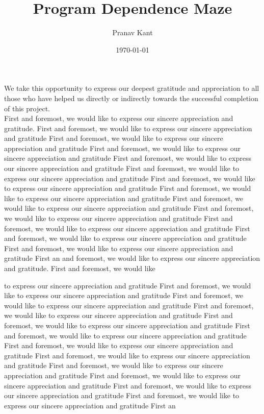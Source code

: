 \documentclass{nithreport}
\title{Program Dependence Maze}
\author{Pranav Kant}
\date{\today}
\begin{document}
  
\maketitle
{}
\certificate


\begin{acknowledgments}
We take this opportunity to express our deepest gratitude and appreciation to all those who have helped us directly or indirectly towards the successful completion of this project.\\
First and foremost, we would like to express our sincere appreciation and gratitude. First and foremost, we would like to express our sincere appreciation and gratitude First and foremost, we would like to express our sincere appreciation and gratitude First and foremost, we would like to express our sincere appreciation and gratitude First and foremost, we would like to express our sincere appreciation and gratitude First and foremost, we would like to express our sincere appreciation and gratitude First and foremost, we would like to express our sincere appreciation and gratitude First and foremost, we would like to express our sincere appreciation and gratitude First and foremost, we would like to express our sincere appreciation and gratitude First and foremost, we would like to express our sincere appreciation and gratitude First and foremost, we would like to express our sincere appreciation and gratitude First and foremost, we would like to express our sincere appreciation and gratitude First and foremost, we would like to express our sincere appreciation and gratitude First an and foremost, we would like to express our sincere appreciation and gratitude. First and foremost, we would like

to express our sincere appreciation and gratitude First and foremost, we would like to express our sincere appreciation and gratitude First and foremost, we would like to express our sincere appreciation and gratitude First and foremost, we would like to express our sincere appreciation and gratitude First and foremost, we would like to express our sincere appreciation and gratitude First and foremost, we would like to express our sincere appreciation and gratitude First and foremost, we would like to express our sincere appreciation and gratitude First and foremost, we would like to express our sincere appreciation and gratitude First and foremost, we would like to express our sincere appreciation and gratitude First and foremost, we would like to express our sincere appreciation and gratitude First and foremost, we would like to express our sincere appreciation and gratitude First and foremost, we would like to express our sincere appreciation and gratitude First an

\end{acknowledgments}
\end{document}
